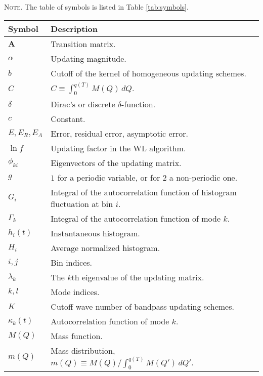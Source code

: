 \documentclass[reprint, superscriptaddress, floatfix]{revtex4-1}
\newcommand{\note}[1]{{\color{DarkGreen}\footnotesize \textsc{Note.} #1}}
\newcommand{\Err}{E}
\begin{document}
\note{The table of symbols is listed in Table \ref{tab:symbols}.
  \begin{table*}
  \footnotesize
  \centering
  \rowcolors{1}{white}{LightGray}
  \setlength{\tabcolsep}{4pt} %
  \caption{\label{tab:symbols}
    Table of symbols.}
  \begin{tabular}{l | p{12cm} }
    Symbol          &   Description \\
    \hline
    $\mathbf{A}$    &   Transition matrix. \\
    $\alpha$        &   Updating magnitude. \\
    $b$             &   Cutoff of the kernel of homogeneous updating schemes. \\
    $C$             &   $C \equiv \int_0^{ q(T) } M(Q) \, dQ$.  \\
    $\delta$        &   Dirac's or discrete $\delta$-function. \\
    $c$             &   Constant. \\
    $\Err, \Err_R, \Err_A$          &   Error, residual error, asymptotic error. \\
    $\ln f$         &   Updating factor in the WL algorithm.  \\
    $\phi_{ki}$     &   Eigenvectors of the updating matrix. \\
    $g$             &   $1$ for a periodic variable, or for $2$ a non-periodic one. \\
    $G_i$           &   Integral of the autocorrelation function of histogram fluctuation at bin $i$. \\
    $\Gamma_k$      &   Integral of the autocorrelation function of mode $k$. \\
    $h_i(t)$        &   Instantaneous histogram.  \\
    $H_i$           &   Average normalized histogram.  \\
    $i, j$          &   Bin indices. \\
    $\lambda_k$     &   The $k$th eigenvalue of the updating matrix. \\
    $k, l$          &   Mode indices. \\
    $K$             &   Cutoff wave number of bandpass updating schemes.  \\
    $\kappa_k(t)$   &   Autocorrelation function of mode $k$. \\
    $M(Q)$          &   Mass function.   \\
    $m(Q)$          &   Mass distribution,
                        $m(Q) \equiv M(Q)/\int_0^{ q(T) } M(Q') \, dQ'$.  \\

\end{tabular}
\end{table*}}
\end{document}
